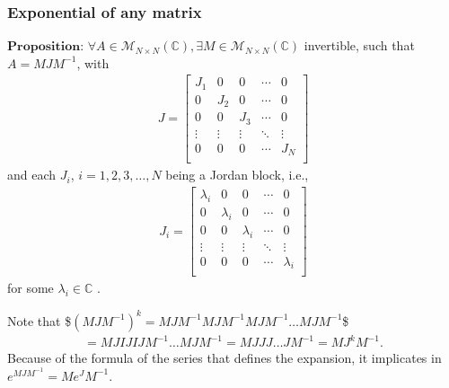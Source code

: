 \documentclass[letterpaper,10pt,english]{jupyterBook}
\begin{document}
\subsubsection{Exponential of any matrix}
\label{\detokenize{cap3:exponential-of-any-matrix}}
\sphinxAtStartPar
\(\textbf{Proposition: } \forall A \in \mathscr{M}_{N \times N}(\mathbb{C}), \exists M \in \mathscr{M}_{N \times N}(\mathbb{C})\) invertible, such that \(A = MJM^{-1}\), with
\begin{equation*}
\begin{split} 
J = \left[ {\begin{array}{ccccc}
    J_1 & 0 & 0 & \dotsm & 0\\
    0 & J_2 & 0 & \dotsm & 0\\
    0 & 0 & J_3 & \dotsm & 0\\
    \vdots & \vdots & \vdots & \ddots & \vdots\\
    0 & 0 & 0 & \dotsm & J_{N}\\
\end{array} } \right]
\end{split}
\end{equation*}
\sphinxAtStartPar
and each \(J_i\), \(i = 1, 2, 3, \dotsc, N\) being a Jordan block, i.e.,
\begin{equation*}
\begin{split}
J_i = \left[ {\begin{array}{ccccc}
    \lambda_i & 0 & 0 & \dotsm & 0\\
    0 & \lambda_i & 0 & \dotsm & 0\\
    0 & 0 & \lambda_i & \dotsm & 0\\
    \vdots & \vdots & \vdots & \ddots & \vdots\\
    0 & 0 & 0 & \dotsm & \lambda_i\\
\end{array} } \right]
\end{split}
\end{equation*}
\sphinxAtStartPar
for some \(\lambda_i \in \mathbb{C}\) .

\sphinxAtStartPar
Note that
\$\(
    (MJM^{-1})^k = MJM^{-1}MJM^{-1}MJM^{-1} \dotsc MJM^{-1} 
\)\$
\begin{equation*}
\begin{split}
    = MJIJIJM^{-1} \dotsc MJM^{-1} = MJJJ \dotsc JM^{-1} = MJ^kM^{-1}.
\end{split}
\end{equation*}
\sphinxAtStartPar
Because of the formula of the series that defines the expansion, it implicates in \(e^{MJM^{-1}} = M e^J M^{-1}\).
\end{document}
